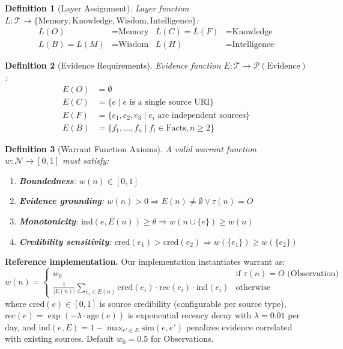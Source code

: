 \documentclass[11pt,letterpaper]{article}
\newtheorem{definition}{Definition}[section]
\begin{document}
\begin{definition}[Layer Assignment]
\label{def:layers}
Layer function $L: \mathcal{T} \to \{\text{Memory}, \text{Knowledge}, \text{Wisdom}, \text{Intelligence}\}$:
\begin{align*}
L(O) &= \text{Memory} & L(C) = L(F) &= \text{Knowledge} \\
L(B) = L(M) &= \text{Wisdom} & L(H) &= \text{Intelligence}
\end{align*}
\end{definition}

\begin{definition}[Evidence Requirements]
\label{def:evidence}
Evidence function $E: \mathcal{T} \to \mathcal{P}(\text{Evidence})$:
\begin{align*}
E(O) &= \emptyset \\
E(C) &= \{e \mid e \text{ is a single source URI}\} \\
E(F) &= \{e_1, e_2, e_3 \mid e_i \text{ are independent sources}\} \\
E(B) &= \{f_1, \ldots, f_n \mid f_i \in \text{Facts}, n \geq 2\}
\end{align*}
\end{definition}

\begin{definition}[Warrant Function Axioms]
\label{def:warrant}
A valid warrant function $w: \mathcal{N} \to [0,1]$ must satisfy:
\begin{enumerate}[noitemsep]
    \item[(W1)] \textbf{Boundedness}: $w(n) \in [0,1]$
    \item[(W2)] \textbf{Evidence grounding}: $w(n) > 0 \Rightarrow E(n) \neq \emptyset \vee \tau(n) = O$
    \item[(W3)] \textbf{Monotonicity}: $\text{ind}(e, E(n)) \geq \theta \Rightarrow w(n \cup \{e\}) \geq w(n)$
    \item[(W4)] \textbf{Credibility sensitivity}: $\text{cred}(e_1) > \text{cred}(e_2) \Rightarrow w(\{e_1\}) \geq w(\{e_2\})$
\end{enumerate}
\end{definition}

\textbf{Reference implementation.} Our implementation instantiates warrant as:
\[
w(n) = \begin{cases}
w_0 & \text{if } \tau(n) = O \text{ (Observation)} \\[4pt]
\displaystyle\frac{1}{|E(n)|} \sum_{e_i \in E(n)} \text{cred}(e_i) \cdot \text{rec}(e_i) \cdot \text{ind}(e_i) & \text{otherwise}
\end{cases}
\]
where $\text{cred}(e) \in [0,1]$ is source credibility (configurable per source type), $\text{rec}(e) = \exp(-\lambda \cdot \text{age}(e))$ is exponential recency decay with $\lambda = 0.01$ per day, and $\text{ind}(e, E) = 1 - \max_{e' \in E} \text{sim}(e, e')$ penalizes evidence correlated with existing sources. Default $w_0 = 0.5$ for Observations.
\end{document}

